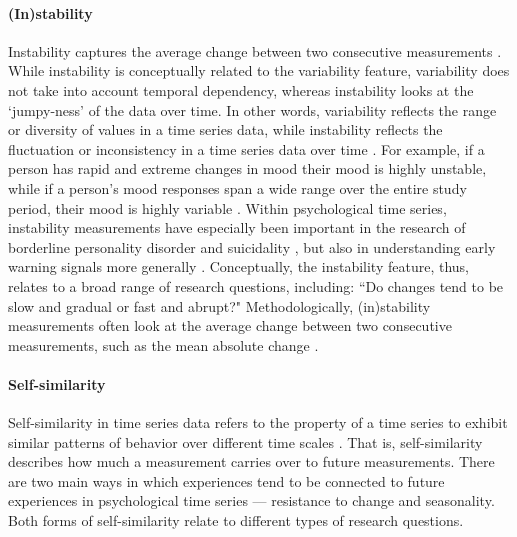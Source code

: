\documentclass[man, 12pt, a4paper, mask, floatsintext]{apa7}
\theoremstyle{break}
\theoremstyle{plain}
\begin{document}
\paragraph{(In)stability} Instability captures the average change between two consecutive measurements \citep{ebner-priemer2009}. While instability is conceptually related to the variability feature, variability does not take into account temporal dependency, whereas instability looks at the `jumpy-ness' of the data over time. In other words, variability reflects the range or diversity of values in a time series data, while instability reflects the fluctuation or inconsistency in a time series data over time  \citep{trull2008}. For example, if a person has rapid and extreme changes in mood their mood is highly unstable, while if a person's mood responses span a wide range over the entire study period, their mood is highly variable \citep{jahng2008}. Within psychological time series, instability measurements have especially been important in the research of borderline personality disorder \citep{trull2008} and suicidality \citep{kivela2022}, but also in understanding early warning signals more generally \citep{wichers2019}. Conceptually, the instability feature, thus, relates to a broad range of research questions, including: ``Do changes tend to be slow and gradual or fast and abrupt?" Methodologically, (in)stability measurements often look at the average change between two consecutive measurements, such as the mean absolute change \citep[e.g.,][]{ebner-priemer2009,barandas2020}. 

\paragraph{Self-similarity} Self-similarity in time series data refers to the property of a time series to exhibit similar patterns of behavior over different time scales \citep{dmello2021}. That is, self-similarity describes how much a measurement carries over to future measurements. There are two main ways in which experiences tend to be connected to future experiences in psychological time series --- resistance to change and seasonality. Both forms of self-similarity relate to different types of research questions. 
\end{document}
